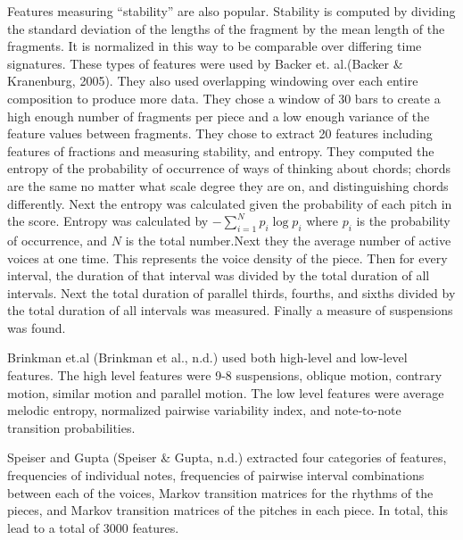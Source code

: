 \documentclass[12pt,twoside]{reedthesis}
\theoremstyle{definition}
\theoremstyle{definition}
\theoremstyle{definition}
\theoremstyle{remark}
\begin{document}
Features measuring ``stability'' are also popular. Stability is computed
by dividing the standard deviation of the lengths of the fragment by the
mean length of the fragments. It is normalized in this way to be
comparable over differing time signatures. These types of features were
used by Backer et. al.(Backer \& Kranenburg, 2005). They also used
overlapping windowing over each entire composition to produce more data.
They chose a window of 30 bars to create a high enough number of
fragments per piece and a low enough variance of the feature values
between fragments. They chose to extract 20 features including features
of fractions and measuring stability, and entropy. They computed the
entropy of the probability of occurrence of ways of thinking about
chords; chords are the same no matter what scale degree they are on, and
distinguishing chords differently. Next the entropy was calculated given
the probability of each pitch in the score. Entropy was calculated by
\(-\sum_{i = 1}^{N}p_i\log{p_i}\) where \(p_i\) is the probability of
occurrence, and \(N\) is the total number.Next they the average number
of active voices at one time. This represents the voice density of the
piece. Then for every interval, the duration of that interval was
divided by the total duration of all intervals. Next the total duration
of parallel thirds, fourths, and sixths divided by the total duration of
all intervals was measured. Finally a measure of suspensions was found.

Brinkman et.al (Brinkman et al., n.d.) used both high-level and
low-level features. The high level features were 9-8 suspensions,
oblique motion, contrary motion, similar motion and parallel motion. The
low level features were average melodic entropy, normalized pairwise
variability index, and note-to-note transition probabilities.

Speiser and Gupta (Speiser \& Gupta, n.d.) extracted four categories of
features, frequencies of individual notes, frequencies of pairwise
interval combinations between each of the voices, Markov transition
matrices for the rhythms of the pieces, and Markov transition matrices
of the pitches in each piece. In total, this lead to a total of 3000
features.
\end{document}
